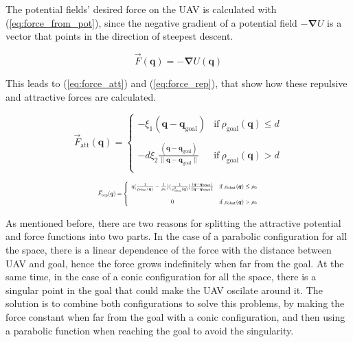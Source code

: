 \documentclass[journal]{IEEEtran}
\newcommand*{\subb}[1]{_{\mathrm{#1}}}
\begin{document}
	The potential fields' desired force on the UAV is calculated with (\ref{eq:force_from_pot}), since the negative gradient of a potential field $-\bm{\nabla} U$ is a vector that points in the direction of steepest descent. 
	
	\begin{equation} \label{eq:force_from_pot}
		\vec{F}(\bm{q}) = - \bm{\nabla} U(\bm{q})
	\end{equation}
	
	This leads to (\ref{eq:force_att}) and (\ref{eq:force_rep}), that show how these repulsive and attractive forces are calculated.
	
	\begin{equation} \label{eq:force_att}
		\vec{F}\subb{att}(\bm{q}) =  \left\lbrace  {\begin{array}{cc}
			- \xi\subb{1} (\bm{q}-\bm{q\subb{goal}})& \textrm{if} \ \rho\subb{goal}(\bm{q})\leq d \\
			\\
			-d \xi\subb{2} \frac{(\bm{q}-\bm{q\subb{goal}})}{\parallel\bm{q}-\bm{q\subb{goal}}\parallel}&\textrm{if} \ \rho\subb{goal}(\bm{q})> d \\
			\end{array} } \right.
	\end{equation}

	\begin{equation} \label{eq:force_rep}	
		\resizebox{0.5\textwidth}{!}{ $
		\vec{F}\subb{rep}(\bm{q}) =  \left\lbrace  {\begin{array}{cc}
		\eta (\frac{1}{\rho\subb{obst}(\bm{q})}-\frac{1}{\rho\subb{0}})(\frac{1}{\rho\subb{obst}^2(\bm{q})})\frac{(\bm{q}-\bm{q\subb{obst}})}{\parallel\bm{q}-\bm{q\subb{obst}}\parallel} & \textrm{if} \ \rho\subb{obst}(\bm{q})\leq \rho\subb{0} \\
		\\
		0 &\textrm{if} \ \rho\subb{obst}(\bm{q})> \rho\subb{0} \\
		\end{array} } \right. $}
	\end{equation}
	
	As mentioned before, there are two reasons for splitting the attractive potential and force functions into two parts. In the case of a parabolic configuration for all the space, there is a linear dependence of the force with the distance between UAV and goal, hence the force grows indefinitely when far from the goal. At the same time, in the case of a conic configuration for all the space, there is a singular point in the goal that could make the UAV oscilate around it. The solution is to combine both configurations to solve this problems, by making the force constant when far from the goal with a conic configuration, and then using a parabolic function when reaching the goal to avoid the singularity.\\
	
\end{document}
